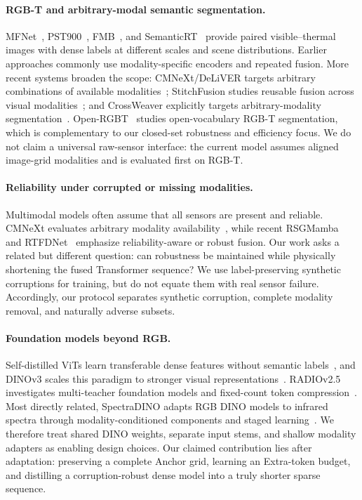 \documentclass[10pt,twocolumn,letterpaper]{article}
\begin{document}
\paragraph{RGB-T and arbitrary-modal semantic segmentation.}
MFNet~\cite{ha2017mfnet}, PST900~\cite{shivakumar2019pst900}, FMB~\cite{liu2023segmif}, and SemanticRT~\cite{ji2023semanticrt} provide paired visible--thermal images with dense labels at different scales and scene distributions.
Earlier approaches commonly use modality-specific encoders and repeated fusion.
More recent systems broaden the scope: CMNeXt/DeLiVER targets arbitrary combinations of available modalities~\cite{zhang2023deliver}; StitchFusion studies reusable fusion across visual modalities~\cite{li2024stitchfusion}; and CrossWeaver explicitly targets arbitrary-modality segmentation~\cite{zhang2026crossweaver}.
Open-RGBT~\cite{yu2024openrgbt} studies open-vocabulary RGB-T segmentation, which is complementary to our closed-set robustness and efficiency focus.
We do not claim a universal raw-sensor interface: the current model assumes aligned image-grid modalities and is evaluated first on RGB-T.

\paragraph{Reliability under corrupted or missing modalities.}
Multimodal models often assume that all sensors are present and reliable.
CMNeXt evaluates arbitrary modality availability~\cite{zhang2023deliver}, while recent RSGMamba~\cite{xu2026rsgmamba} and RTFDNet~\cite{tan2026rtfdnet} emphasize reliability-aware or robust fusion.
Our work asks a related but different question: can robustness be maintained while physically shortening the fused Transformer sequence?
We use label-preserving synthetic corruptions for training, but do not equate them with real sensor failure.
Accordingly, our protocol separates synthetic corruption, complete modality removal, and naturally adverse subsets.

\paragraph{Foundation models beyond RGB.}
Self-distilled ViTs learn transferable dense features without semantic labels~\cite{caron2021dino}, and DINOv3 scales this paradigm to stronger visual representations~\cite{simeoni2025dinov3}.
RADIOv2.5 investigates multi-teacher foundation models and fixed-count token compression~\cite{heinrich2024radiov25}.
Most directly related, SpectraDINO adapts RGB DINO models to infrared spectra through modality-conditioned components and staged learning~\cite{nalcakan2026spectradino}.
We therefore treat shared DINO weights, separate input stems, and shallow modality adapters as enabling design choices.
Our claimed contribution lies after adaptation: preserving a complete Anchor grid, learning an Extra-token budget, and distilling a corruption-robust dense model into a truly shorter sparse sequence.
\end{document}
